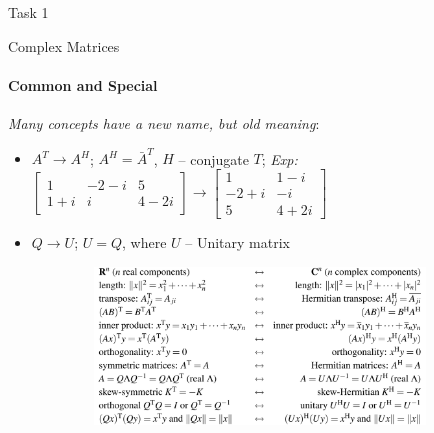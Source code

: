 \documentclass[aspectratio=169]{beamer}
\begin{document}
\begin{frame}[t]{Task 1}
\end{frame}

\begin{frame}[t]{Complex Matrices}
\framesubtitle{Common and Special}
\vspace{-0.3cm}
    \large \textit{Many concepts have a new name, but old meaning}:
    \vspace{-0.25cm}
    \begin{itemize}
        \item $A^T \rightarrow A^H$; $A^H = \bar{A}^T$, $H$ -- conjugate $T$; \textit{Exp:} {\scriptsize $\begin{bmatrix}
        1 & -2-i & 5 \\
        1+i & i & 4-2i 
        \end{bmatrix} \rightarrow \begin{bmatrix}
        1 & 1-i \\
        -2+i & -i \\ 
        5 & 4+2i 
        \end{bmatrix}$}
        \vspace{-0.3cm}
        \item $Q \rightarrow U$; $U=Q$, where $U$ -- Unitary matrix
    \end{itemize}
    \vspace{-0.38cm}
    \begin{figure}[H]
        \centering\includegraphics[height=4.2cm,width=1\textwidth,keepaspectratio]{complex_matrices.png}
        \label{fig:complex_matrices.png}
    \end{figure}
\end{frame}
\end{document}
